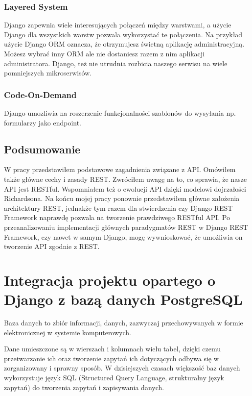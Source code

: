 \documentclass[oneside,polski,logo,indent]{amuthesis}
\begin{document}
\begin{center}
\subsection{Layered System}
\end{center}
Django zapewnia wiele interesujących połączeń między warstwami, a użycie Django dla wszystkich warstw pozwala wykorzystać te połączenia. Na przykład użycie Django ORM oznacza, że otrzymujesz świetną aplikację administracyjną. Możesz wybrać inny ORM ale nie dostaniesz razem z nim aplikacji administratora. Django, też nie utrudnia rozbicia naszego serwisu na wiele pomniejszych mikroserwisów. 


\begin{center}
\subsection{Code-On-Demand}
\end{center}
Django umozliwia na roszerzenie funkcjonalności szablonów do wysyłania np. formularzy jako endpoint.

\section{Podsumowanie}
W pracy przedstawiłem podstawowe zagadnienia związane z API. Omówiłem także główne cechy i zasady REST. Zwróciłem uwagę na to, co sprawia, że nasze API jest RESTful. Wspomniałem też o ewolucji API dzięki modelowi dojrzałości Richardsona. Na końcu mojej pracy ponownie przedstawiłem główne założenia architektury REST, jednakże tym razem dla stwierdzenia czy Django REST Framework naprawdę pozwala na tworzenie prawdziwego RESTful API. Po przeanalizowaniu implementacji głównych paradygmatów REST w Django REST Framework, czy nawet w samym Django, mogę wywnioskować, że umożliwia on tworzenie API zgodnie z REST. 

\chapter{Integracja projektu opartego o Django z bazą danych PostgreSQL}
Baza danych to zbiór informacji, danych, zazwyczaj przechowywanych w formie elektronicznej w systemie komputerowych.  

Dane umieszczone są w wierszach i kolumnach wielu tabel, dzięki czemu przetwarzanie ich oraz tworzenie zapytań ich dotyczących odbywa się w zorganizowany i sprawny sposób. W dzisiejszych czasach większość baz danych wykorzystuje język SQL (Structured Query Language, strukturalny język zapytań) do tworzenia zapytań i zapisywania danych.  
\end{document}
